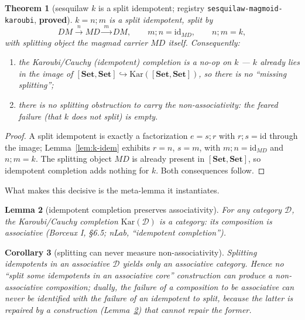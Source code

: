 \documentclass[11pt]{amsart}
\theoremstyle{plain}
\newtheorem{theorem}{Theorem}[section]
\newtheorem{lemma}[theorem]{Lemma}
\newtheorem{corollary}[theorem]{Corollary}
\theoremstyle{definition}
\theoremstyle{remark}
\newcommand{\Set}{\mathbf{Set}}
\newcommand{\Kar}{\mathrm{Kar}}
\newcommand{\id}{\mathrm{id}}
\newcommand{\comp}{\mathbin{;}}
\begin{document}
\begin{theorem}[sesquilaw $k$ is a split idempotent; registry \texttt{sesquilaw-magmoid-karoubi}, \textbf{proved}]
\label{thm:split}
$k=n\comp m$ is a \emph{split} idempotent, split by
\[
  DM \xrightarrow{\;n\;} MD \xrightarrow{\;m\;} DM,
  \qquad m\comp n=\id_{MD},\qquad n\comp m=k,
\]
with splitting object the magmad carrier $MD$ itself. Consequently:
\begin{enumerate}
  \item the Karoubi/Cauchy (idempotent) completion is a \emph{no-op} on $k$ --- $k$ already lies in
        the image of $[\Set,\Set]\hookrightarrow\Kar([\Set,\Set])$, so there is no ``missing
        splitting'';
  \item there is \emph{no splitting obstruction} to carry the non-associativity: the feared failure
        (that $k$ does not split) is empty.
\end{enumerate}
\end{theorem}

\begin{proof}
A split idempotent is exactly a factorization $e=s\comp r$ with $r\comp s=\id$ through the image;
Lemma~\ref{lem:k-idem} exhibits $r=n$, $s=m$, with $m\comp n=\id_{MD}$ and $n\comp m=k$. The
splitting object $MD$ is already present in $[\Set,\Set]$, so idempotent completion adds nothing for
$k$. Both consequences follow.
\end{proof}

What makes this decisive is the meta-lemma it instantiates.

\begin{lemma}[idempotent completion preserves associativity]
\label{lem:meta}
For any category $\mathcal{D}$, the Karoubi/Cauchy completion $\Kar(\mathcal{D})$ is a
\emph{category}: its composition is associative (Borceux I, \S6.5; nLab, ``idempotent completion'').
\end{lemma}

\begin{corollary}[splitting can never measure non-associativity]
\label{cor:orthogonal}
Splitting idempotents in an associative $\mathcal{D}$ yields only an \emph{associative} category.
Hence no ``split some idempotents in an associative core'' construction can \emph{produce} a
non-associative composition; dually, the failure of a composition to be associative can never be
\emph{identified with} the failure of an idempotent to split, because the latter is repaired by a
construction (Lemma~\ref{lem:meta}) that cannot repair the former.
\end{corollary}
\end{document}
